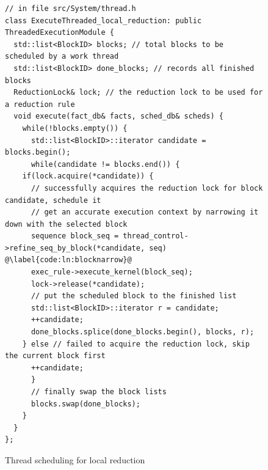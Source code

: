 \documentclass{article}
\begin{document}
\begin{figure}[h]
\begin{lstlisting}[escapechar=@]
// in file src/System/thread.h
class ExecuteThreaded_local_reduction: public ThreadedExecutionModule {
  std::list<BlockID> blocks; // total blocks to be scheduled by a work thread
  std::list<BlockID> done_blocks; // records all finished blocks
  ReductionLock& lock; // the reduction lock to be used for a reduction rule
  void execute(fact_db& facts, sched_db& scheds) {
    while(!blocks.empty()) {
      std::list<BlockID>::iterator candidate = blocks.begin();
      while(candidate != blocks.end()) {
	if(lock.acquire(*candidate)) {
	  // successfully acquires the reduction lock for block candidate, schedule it
	  // get an accurate execution context by narrowing it down with the selected block
	  sequence block_seq = thread_control->refine_seq_by_block(*candidate, seq) @\label{code:ln:blocknarrow}@
	  exec_rule->execute_kernel(block_seq);
	  lock->release(*candidate);
	  // put the scheduled block to the finished list
	  std::list<BlockID>::iterator r = candidate;
	  ++candidate;
	  done_blocks.splice(done_blocks.begin(), blocks, r);
	} else // failed to acquire the reduction lock, skip the current block first
	  ++candidate;
      }
      // finally swap the block lists
      blocks.swap(done_blocks);
    }
  }
};
\end{lstlisting}
\caption{Thread scheduling for local reduction\label{fig:etlr}}
\end{figure}
\end{document}
